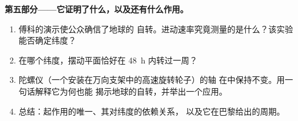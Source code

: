 \begin{problem}
\medskip
\noindent\textbf{第五部分——它证明了什么，以及还有什么作用。}
\begin{enumerate}[resume]
  \item 傅科的演示使公众确信了地球的
        自转。进动速率究竟测量的是什么？该实验
        能否确定纬度？
  \item 在哪个纬度，摆动平面恰好在 \qty{48}{h} 内转过一周？
  \item 陀螺仪（一个安装在万向支架中的高速旋转轮子）的轴
        在中保持不变。用一句话解释它为何也能
        揭示地球的自转，并举出一个应用。
  \item 总结：起作用的唯一、其对纬度的依赖关系，
        以及它在巴黎给出的周期。
\end{enumerate}
\end{problem}
